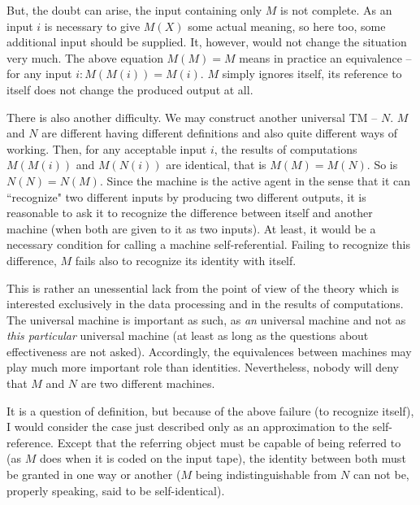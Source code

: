 But, the doubt can arise, the input containing only $M$ is not complete. As an input $i$ is necessary to give $M(X)$ 
some actual meaning, so here too, some additional input should be supplied. It, however, would not change the 
situation very much. The above equation $M(M)=M$ means in practice an equivalence -- for any input $i : 
M(M(i))=M(i).$ $M$ simply ignores itself, its reference to itself does not change the produced output at all.

There is also another difficulty. We may construct another universal TM -- $N$. $M$ and $N$
 are different having 
different definitions and also quite different ways of working. Then, for any acceptable input $i$, the results of 
computations $M(M(i))$ and $M(N(i))$ are identical, that is $M(M)=M(N)$. So is $N(N)=N(M).$
 Since the machine is the 
active agent in the sense that it can ``recognize" two different inputs by producing two different outputs, it is 
reasonable to ask it to recognize the difference between itself and another machine (when both are given to it as 
two inputs). At least, it would be a necessary condition for calling a machine self-referential. Failing to recognize 
this difference, $M$ fails also to recognize its identity with itself.

This is rather an unessential lack from the point of view of the theory which is interested exclusively in the data 
processing and in the results of computations. The universal machine is important as such, as {\em an} universal 
machine and not as {\em this particular} universal machine (at least as long as the questions about effectiveness are not 
asked). Accordingly, the equivalences between machines may play much more important role 
than identities. Nevertheless, 
nobody will deny that $M$ and $N$ are two different machines.

It is a question of definition, but because of the above failure (to recognize itself), 
I would consider the case just described only as 
an approximation to the self-reference. Except that the referring object must be capable of being referred to (as $M$ 
does when it is coded on the input tape), the identity between both must be granted in one way or another ($M$ 
being indistinguishable from $N$ can not be, properly speaking, said to be self-identical).

